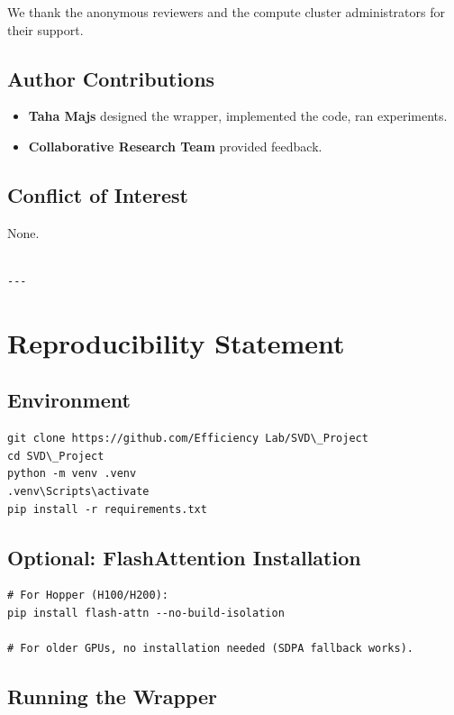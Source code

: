 We thank the anonymous reviewers and the compute cluster administrators for their support.

\subsection{Author Contributions}

\begin{itemize}
\item \textbf{Taha Majs} designed the wrapper, implemented the code, ran experiments.
\item \textbf{Collaborative Research Team} provided feedback.

\end{itemize}
\subsection{Conflict of Interest}

None.
\begin{lstlisting}

---
\end{lstlisting}

\section{Reproducibility Statement}

\subsection{Environment}

\begin{lstlisting}
git clone https://github.com/Efficiency Lab/SVD\_Project
cd SVD\_Project
python -m venv .venv
.venv\Scripts\activate
pip install -r requirements.txt
\end{lstlisting}

\subsection{Optional: FlashAttention Installation}

\begin{lstlisting}
# For Hopper (H100/H200):
pip install flash-attn --no-build-isolation

# For older GPUs, no installation needed (SDPA fallback works).
\end{lstlisting}

\subsection{Running the Wrapper}

